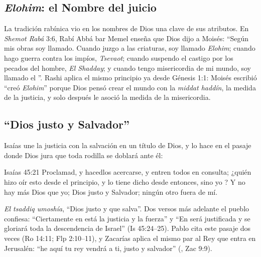 \subsection{\emph{Elohim}: el Nombre del juicio}
La tradición rabínica vio en los nombres de Dios una clave de sus atributos. En \emph{Shemot Rabá} 3:6, Rabí Abbá bar Memel enseña que Dios dijo a Moisés: ``Según mis obras soy llamado. Cuando juzgo a las criaturas, soy llamado \emph{Elohim}; cuando hago guerra contra los impíos, \emph{Tsevaot}; cuando suspendo el castigo por los pecados del hombre, \emph{El Shadday}; y cuando tengo misericordia de mi mundo, soy llamado el \SENOR''. Rashi aplica el mismo principio ya desde Génesis 1:1: Moisés escribió ``creó \emph{Elohim}'' porque Dios pensó crear el mundo con la  \emph{middat haddín}, la medida de la justicia, y solo después le asoció la medida de la misericordia.


\subsection{“Dios justo y Salvador”}
Isaías une la justicia con la salvación en un título de Dios, y lo hace en el pasaje donde Dios jura que toda rodilla se doblará ante él:

\begin{verso}{Isaías 45:21}
Proclamad, y hacedlos acercarse, y entren todos en consulta; ¿quién hizo oír esto desde el principio, y lo tiene dicho desde entonces, sino yo \SENOR? Y no hay más Dios que yo; Dios justo y Salvador; ningún otro fuera de mí.
\end{verso}

\emph{El tsaddiq umoshía}, ``Dios justo y que salva''. Dos versos más adelante el pueblo confiesa: ``Ciertamente en \SENOR{} está la justicia y la fuerza'' y ``En \SENOR{} será justificada y se gloriará toda la descendencia de Israel'' (Is 45:24--25). Pablo cita este pasaje dos veces (Ro 14:11; Flp 2:10--11), y Zacarías aplica el mismo par al Rey que entra en Jerusalén: ``he aquí tu rey vendrá a ti, justo y salvador'' (, Zac 9:9).

